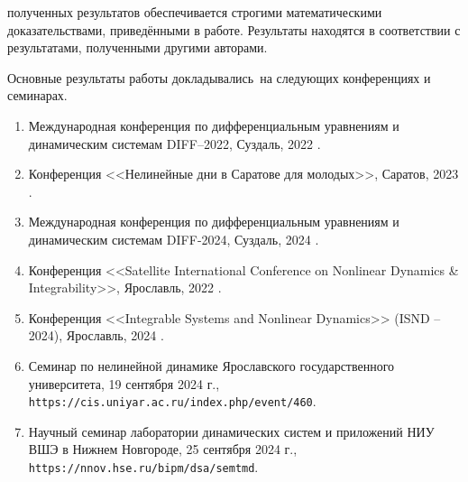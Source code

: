 
{\reliability} полученных результатов обеспечивается строгими математическими доказательствами, приведёнными в работе. Результаты находятся в соответствии с результатами, полученными другими авторами.

\nocite{scbib1, wosbib1, wosbib2}

{\probation}
Основные результаты работы докладывались~на следующих конференциях и семинарах.
\begin{enumerate}
	\item Международная конференция по дифференциальным уравнениям и динамическим системам DIFF--2022, Суздаль, 2022  \cite{confbib1}.
	\item Конференция <<Нелинейные дни в Саратове для молодых>>, Саратов, 2023 \cite{confbib2}.
	\item Международная конференция по дифференциальным уравнениям и динамическим системам DIFF-2024, Суздаль, 2024 \cite{confbib3}.
	\item Конференция <<Satellite International Conference on Nonlinear Dynamics {\&} Integrability>>, Ярославль, 2022 \cite{confbib4}.
	\item Конференция <<Integrable Systems and Nonlinear Dynamics>> (ISND – 2024), Ярославль, 2024 \cite{confbib5}.
	\item Семинар по нелинейной динамике Ярославского государственного университета, 19 сентября 2024 г.,\\\texttt{https://cis.uniyar.ac.ru/index.php/event/460}.
	\item Научный семинар лаборатории динамических систем и приложений НИУ ВШЭ в Нижнем Новгороде, 25 сентября 2024 г.,\\\texttt{https://nnov.hse.ru/bipm/dsa/semtmd}.
\end{enumerate}


\vspace{-11em}

